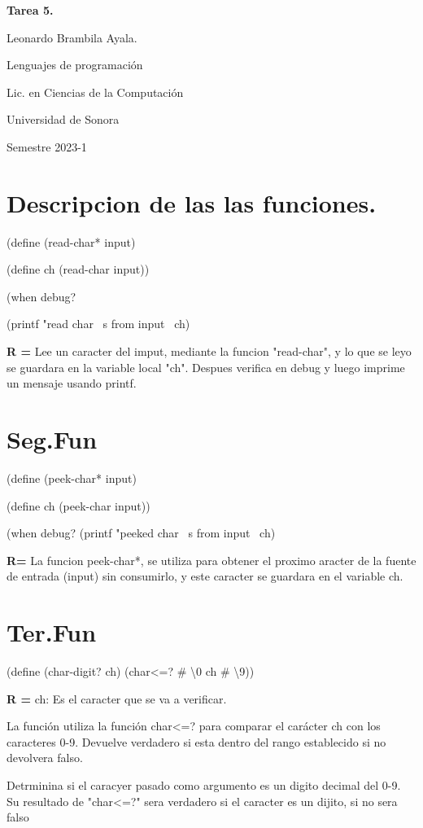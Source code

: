 \documentclass[letterpaper,12pt]{article}
\begin{document}
\begin{center}
  \textbf{Tarea 5.}\par
  \bigskip
  Leonardo Brambila Ayala.\par
  \bigskip
  Lenguajes de programación\par
  Lic. en Ciencias de la Computación\par
  Universidad de Sonora\par
  Semestre 2023-1\par
\end{center}

\section {Descripcion de las las funciones.}

\text (define (read-char* input)\par
\text  (define ch (read-char input))\par
\text  (when debug?\par
\text    (printf "read char ~s from input~%
\text  ch)
\par
\textbf {R =} 
\text Lee un caracter del imput, mediante la funcion "read-char", y lo que se leyo se guardara en la variable local "ch". Despues verifica en debug y luego imprime un mensaje usando printf.\par

\section* {Seg.Fun}
\text(define (peek-char* input)\par
 \text (define ch (peek-char input))\par
  \text(when debug?
    (printf "peeked char ~s from input~%
  ch)\par

\textbf {R=}
\text La funcion peek-char*, se utiliza para obtener el proximo aracter de la fuente de entrada (input) sin consumirlo, y este caracter se guardara en el variable ch.\par

\section* {Ter.Fun}
\text(define (char-digit? ch)
 \text (char<=? \# \backslash0 ch \# \backslash9))\par
\textbf {R =}
\text ch: Es el caracter que se va a verificar.\par
\text La función utiliza la función char<=? para comparar el carácter ch con los caracteres 0-9. Devuelve verdadero si esta dentro del rango establecido si no devolvera falso.\par
\text Detrminina si el caracyer pasado como argumento es un digito decimal del 0-9. Su resultado de "char<=?" sera verdadero si el caracter es un dijito, si no sera falso\par
\end{document}
